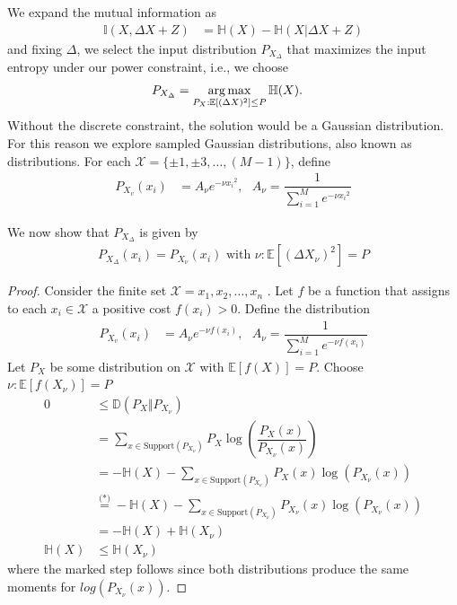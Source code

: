 We expand the mutual information as
\begin{align}
	\mathbb{I}(X,\Delta X+Z) &= \mathbb{H}(X) - \mathbb{H}(X| \Delta X+Z)
\end{align}
and fixing $\Delta$, we select the input distribution $P_{X_\Delta}$ that maximizes the input entropy under our power constraint, i.e., we choose
\begin{align}
	P_{X_\Delta} &= \operatorname*{arg\,max}\limits_{P_X:\mathbb{E}[(\Delta X)^2] \leq P} \mathbb{H}(X).
\end{align}
Without the discrete constraint, the solution would be a Gaussian distribution. For this reason we explore sampled Gaussian distributions, also known as  distributions. For each $\mathcal{X} = \{\pm1, \pm 3,\dots, (M-1)\}$, define
\begin{align}
	P_{X_v}(x_i) &= A_{\nu}e^{-\nu{x_i}^2},\text{  } A_{\nu} = \dfrac{1}{\sum\limits_{i=1}^{M}e^{-\nu{x_i}^2}} 
\end{align}

We now show that $P_{X_\Delta}$ is given by
\begin{align}
P_{X_\Delta}(x_i) = P_{X_\nu}(x_i) \text{ with } \nu : \mathbb{E}[(\Delta X_{\nu})^2] = P
\end{align}

\begin{proof}
Consider the finite set $\mathcal{X} = {x_1, x_2, \dots , x_n}$ . Let $f$ be a function that
assigns to each $x_i \in \mathcal{X}$ a positive cost $f(x_i) > 0$. Define the  distribution
\begin{align}
	P_{X_v}(x_i) &= A_{\nu}e^{-\nu f(x_i)},\text{  } A_{\nu} = \dfrac{1}{\sum\limits_{i=1}^{M}e^{-\nu f(x_i)}} 
\end{align}	
Let $P_X$ be some distribution on $\mathcal{X}$ with $ \mathbb{E}[f(X)] = P $. Choose $\nu : \mathbb{E}[f(X_{\nu})] = P$
\begin{align}
	0 &\leq \mathbb{D}(P_X \Vert P_{X_{\nu}})\\
	&= \sum\limits_{x \in \text{Support}(P_{X_{\nu}})} P_X \log(\dfrac{P_X(x)}{P_{X_{\nu}}(x)}) \\
	&= -\mathbb{H}(X) - \sum\limits_{x \in \text{Support}(P_{X_{\nu}})} P_X(x) \log(P_{X_{\nu}}(x)) \\
	&\overset{\text{(*)}}{=} -\mathbb{H}(X) - \sum\limits_{x \in \text{Support}(P_{X_{\nu}})} P_{X_{\nu}}(x) \log(P_{X_{\nu}}(x)) \\
	&= -\mathbb{H}(X) + \mathbb{H}(X_{\nu}) \\
	\mathbb{H}(X) &\leq \mathbb{H}(X_{\nu})
\end{align}
where the marked step follows since both distributions produce the same moments for $log(P_{X_{\nu}}(x))$.
\end{proof}


